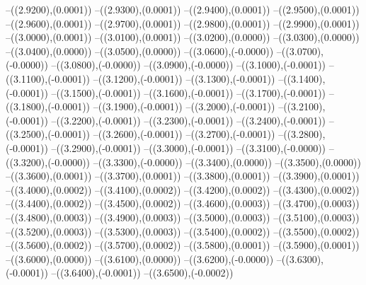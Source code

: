 {	--({\sx*(2.9200)},{\sy*(0.0001)})
	--({\sx*(2.9300)},{\sy*(0.0001)})
	--({\sx*(2.9400)},{\sy*(0.0001)})
	--({\sx*(2.9500)},{\sy*(0.0001)})
	--({\sx*(2.9600)},{\sy*(0.0001)})
	--({\sx*(2.9700)},{\sy*(0.0001)})
	--({\sx*(2.9800)},{\sy*(0.0001)})
	--({\sx*(2.9900)},{\sy*(0.0001)})
	--({\sx*(3.0000)},{\sy*(0.0001)})
	--({\sx*(3.0100)},{\sy*(0.0001)})
	--({\sx*(3.0200)},{\sy*(0.0000)})
	--({\sx*(3.0300)},{\sy*(0.0000)})
	--({\sx*(3.0400)},{\sy*(0.0000)})
	--({\sx*(3.0500)},{\sy*(0.0000)})
	--({\sx*(3.0600)},{\sy*(-0.0000)})
	--({\sx*(3.0700)},{\sy*(-0.0000)})
	--({\sx*(3.0800)},{\sy*(-0.0000)})
	--({\sx*(3.0900)},{\sy*(-0.0000)})
	--({\sx*(3.1000)},{\sy*(-0.0001)})
	--({\sx*(3.1100)},{\sy*(-0.0001)})
	--({\sx*(3.1200)},{\sy*(-0.0001)})
	--({\sx*(3.1300)},{\sy*(-0.0001)})
	--({\sx*(3.1400)},{\sy*(-0.0001)})
	--({\sx*(3.1500)},{\sy*(-0.0001)})
	--({\sx*(3.1600)},{\sy*(-0.0001)})
	--({\sx*(3.1700)},{\sy*(-0.0001)})
	--({\sx*(3.1800)},{\sy*(-0.0001)})
	--({\sx*(3.1900)},{\sy*(-0.0001)})
	--({\sx*(3.2000)},{\sy*(-0.0001)})
	--({\sx*(3.2100)},{\sy*(-0.0001)})
	--({\sx*(3.2200)},{\sy*(-0.0001)})
	--({\sx*(3.2300)},{\sy*(-0.0001)})
	--({\sx*(3.2400)},{\sy*(-0.0001)})
	--({\sx*(3.2500)},{\sy*(-0.0001)})
	--({\sx*(3.2600)},{\sy*(-0.0001)})
	--({\sx*(3.2700)},{\sy*(-0.0001)})
	--({\sx*(3.2800)},{\sy*(-0.0001)})
	--({\sx*(3.2900)},{\sy*(-0.0001)})
	--({\sx*(3.3000)},{\sy*(-0.0001)})
	--({\sx*(3.3100)},{\sy*(-0.0000)})
	--({\sx*(3.3200)},{\sy*(-0.0000)})
	--({\sx*(3.3300)},{\sy*(-0.0000)})
	--({\sx*(3.3400)},{\sy*(0.0000)})
	--({\sx*(3.3500)},{\sy*(0.0000)})
	--({\sx*(3.3600)},{\sy*(0.0001)})
	--({\sx*(3.3700)},{\sy*(0.0001)})
	--({\sx*(3.3800)},{\sy*(0.0001)})
	--({\sx*(3.3900)},{\sy*(0.0001)})
	--({\sx*(3.4000)},{\sy*(0.0002)})
	--({\sx*(3.4100)},{\sy*(0.0002)})
	--({\sx*(3.4200)},{\sy*(0.0002)})
	--({\sx*(3.4300)},{\sy*(0.0002)})
	--({\sx*(3.4400)},{\sy*(0.0002)})
	--({\sx*(3.4500)},{\sy*(0.0002)})
	--({\sx*(3.4600)},{\sy*(0.0003)})
	--({\sx*(3.4700)},{\sy*(0.0003)})
	--({\sx*(3.4800)},{\sy*(0.0003)})
	--({\sx*(3.4900)},{\sy*(0.0003)})
	--({\sx*(3.5000)},{\sy*(0.0003)})
	--({\sx*(3.5100)},{\sy*(0.0003)})
	--({\sx*(3.5200)},{\sy*(0.0003)})
	--({\sx*(3.5300)},{\sy*(0.0003)})
	--({\sx*(3.5400)},{\sy*(0.0002)})
	--({\sx*(3.5500)},{\sy*(0.0002)})
	--({\sx*(3.5600)},{\sy*(0.0002)})
	--({\sx*(3.5700)},{\sy*(0.0002)})
	--({\sx*(3.5800)},{\sy*(0.0001)})
	--({\sx*(3.5900)},{\sy*(0.0001)})
	--({\sx*(3.6000)},{\sy*(0.0000)})
	--({\sx*(3.6100)},{\sy*(0.0000)})
	--({\sx*(3.6200)},{\sy*(-0.0000)})
	--({\sx*(3.6300)},{\sy*(-0.0001)})
	--({\sx*(3.6400)},{\sy*(-0.0001)})
	--({\sx*(3.6500)},{\sy*(-0.0002)})
}
